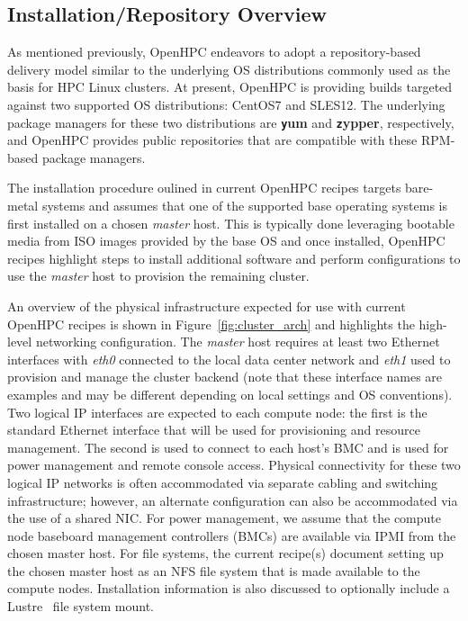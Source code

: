 \documentclass{sig-alternate-05-2015}
\begin{document}
\subsection{Installation/Repository Overview}
\label{sec:repo_enable}

As mentioned previously, OpenHPC endeavors to adopt a repository-based delivery
model similar to the underlying OS distributions commonly used as the basis for HPC
Linux clusters.  At present, OpenHPC is providing builds targeted against two
supported OS distributions: CentOS7 and SLES12. The underlying package
managers for these two distributions are {\bf \texttt yum} and {\bf \texttt zypper},
respectively, and OpenHPC provides public repositories that are compatible with
these RPM-based package managers.

The installation procedure oulined in current OpenHPC recipes targets
bare-metal systems and assumes that one of the supported base operating systems
is first installed on a chosen {\em master} host. This is typically done
leveraging bootable media from ISO images provided by the base OS and once
installed, OpenHPC recipes highlight steps to install additional software and
perform configurations to use the {\em master} host to provision the remaining
cluster.

An overview of the physical infrastructure expected for use with
current OpenHPC recipes is shown in
Figure~\ref{fig:cluster_arch} and highlights the high-level networking
configuration. The {\em master} host requires at least two Ethernet interfaces
with {\em eth0} connected to the local data center network and {\em eth1} used
to provision and manage the cluster backend (note that these interface names
are examples and may be different depending on local settings and OS
conventions). Two logical IP interfaces are expected to each compute node: the
first is the standard Ethernet interface that will be used for provisioning and
resource management. The second is used to connect to each host's BMC and is
used for power management and remote console access. Physical connectivity for
these two logical IP networks is often accommodated via separate cabling and
switching infrastructure; however, an alternate configuration can also be
accommodated via the use of a shared NIC.
For power management, we assume that the compute node baseboard management
controllers (BMCs) are available via IPMI from the chosen master host. For file
systems, the current recipe(s) document setting up the chosen master
host as an NFS file system that is made available to the compute
nodes. Installation information is also discussed to optionally include a
Lustre~\cite{Lustre_url} file system mount.
\end{document}
